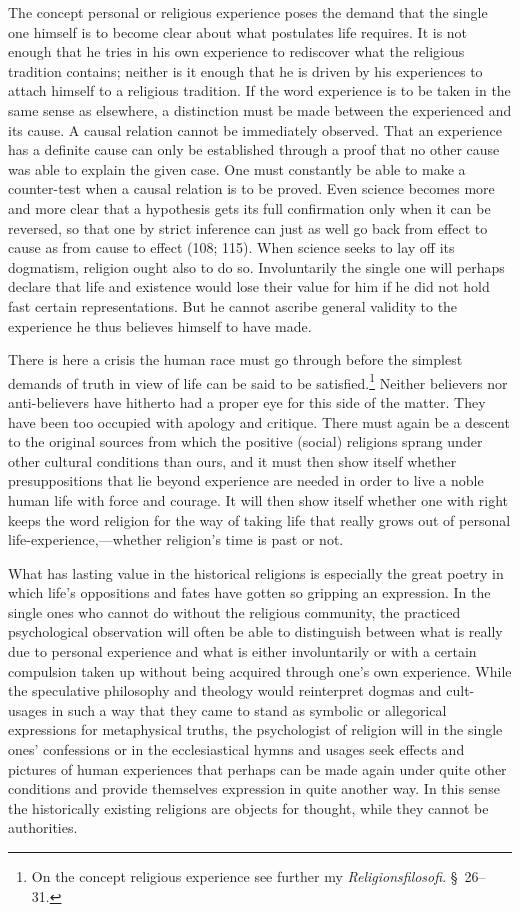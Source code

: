 \documentclass[12pt,a4paper]{book}
\newcommand{\opage}[1]{\marginnote{\footnotesize\textit{[#1]}}}
\begin{document}
The concept personal or religious experience poses the demand that the single one himself is to become clear
about what postulates life requires. It is not enough that he tries in his own experience to rediscover what
the religious tradition contains; neither is it enough that he is driven by his experiences to attach himself
to a religious tradition. If the word experience is to be taken in the same sense as elsewhere, a distinction
must be made between the experienced and its cause. A causal relation cannot be immediately observed. That an
experience has a definite cause can only be established through a proof that no other cause was able to
explain the given case. One must constantly be able to make a counter-test when a causal relation is to be
proved. Even science becomes more and more clear that a hypothesis gets its full confirmation only when it
can be reversed, so that one by strict inference can just as well go \opage{383}back from effect to cause as from cause
to effect (108; 115). When science seeks to lay off its dogmatism, religion ought also to do so.
Involuntarily the single one will perhaps declare that life and existence would lose their value for him if
he did not hold fast certain representations. But he cannot ascribe general validity to the experience he
thus believes himself to have made.

There is here a crisis the human race must go through before the simplest demands of truth in view of life
can be said to be satisfied.\footnote{On the concept religious experience see further my
\emph{Religionsfilosofi}. \S\ 26--31.} Neither believers nor anti-believers have hitherto had a proper eye
for this side of the matter. They have been too occupied with apology and critique. There must again be a
descent to the original sources from which the positive (social) religions sprang under other cultural
conditions than ours, and it must then show itself whether presuppositions that lie beyond experience are
needed in order to live a noble human life with force and courage. It will then show itself whether one with
right keeps the word religion for the way of taking life that really grows out of personal
life-experience,---whether religion's time is past or not.

What has lasting value in the historical religions is especially the great poetry in which life's oppositions
and fates have gotten so gripping an expression. In the single ones who cannot do without the religious
community, the practiced psychological observation will often be able to distinguish between what is really
due to personal experience and what is either involuntarily or with a certain compulsion taken up without
being acquired through one's own experience. While the speculative philosophy and theology would reinterpret
dogmas and cult-usages in such a way that they came to stand as symbolic or allegorical expressions for
metaphysical truths, the psychologist of religion will in the single ones' confessions or in the ecclesiastical hymns and usages seek effects and pictures of human experiences that perhaps can be made again under quite
other conditions and provide themselves expression in quite another way. In this sense the historically
existing \opage{384}religions are objects for thought, while they cannot be authorities.
\end{document}
